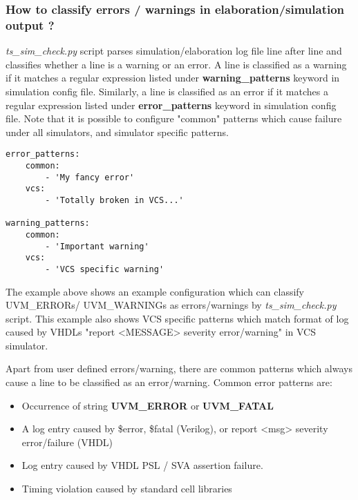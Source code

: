 \documentclass{tropic_design_spec}
\begin{document}
\subsubsection{How to classify errors / warnings in elaboration/simulation output ?}
\label{sec:how-to-classify-errors-warnings-in-elaboration-simulation-output}

\textit{ts_sim_check.py} script parses simulation/elaboration log file line after line and classifies
whether a line is a warning or an error. A line is classified as a warning if it matches a
regular expression listed under \textbf{warning_patterns} keyword in simulation config
file. Similarly, a line is classified as an error if it matches a regular expression
listed under \textbf{error_patterns} keyword in simulation config file. Note that it is
possible to configure "common" patterns which cause failure under all simulators, and
simulator specific patterns.

\begin{lstlisting}
error_patterns:
    common:
        - 'My fancy error'
    vcs:
        - 'Totally broken in VCS...'

warning_patterns:
    common:
        - 'Important warning'
    vcs:
        - 'VCS specific warning'
\end{lstlisting}

The example above shows an example configuration which can classify UVM_ERRORs/ UVM_WARNINGs
as errors/warnings by \textit{ts_sim_check.py} script. This example also shows VCS specific
patterns which match format of log caused by VHDLs "report <MESSAGE> severity error/warning"
in VCS simulator.

Apart from user defined errors/warning, there are common patterns which always cause
a line to be classified as an error/warning. Common error patterns are:
\begin{itemize}
    \item {Occurrence of string \textbf{UVM_ERROR} or \textbf{UVM_FATAL}}
    \item {A log entry caused by \$error, \$fatal (Verilog), or report <msg> severity
           error/failure (VHDL)}
    \item {Log entry caused by VHDL PSL / SVA assertion failure.}
    \item {Timing violation caused by standard cell libraries}
\end{itemize}
\end{document}
